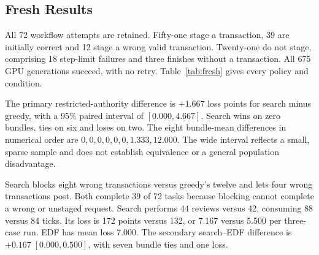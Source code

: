 \subsection{Fresh Results}

All 72 workflow attempts are retained. Fifty-one stage a transaction, 39 are initially correct and 12 stage a wrong valid transaction. Twenty-one do not stage, comprising 18 step-limit failures and three finishes without a transaction. All 675 GPU generations succeed, with no retry. Table~\ref{tab:fresh} gives every policy and condition.

The primary restricted-authority difference is $+1.667$ loss points for search minus greedy, with a 95\% paired interval of $[0.000,4.667]$. Search wins on zero bundles, ties on six and loses on two. The eight bundle-mean differences in numerical order are $0,0,0,0,0,0,1.333,12.000$. The wide interval reflects a small, sparse sample and does not establish equivalence or a general population disadvantage.

Search blocks eight wrong transactions versus greedy's twelve and lets four wrong transactions post. Both complete 39 of 72 tasks because blocking cannot complete a wrong or unstaged request. Search performs 44 reviews versus 42, consuming 88 versus 84 ticks. Its loss is 172 points versus 132, or 7.167 versus 5.500 per three-case run. EDF has mean loss 7.000. The secondary search--EDF difference is $+0.167\;[0.000,0.500]$, with seven bundle ties and one loss.

